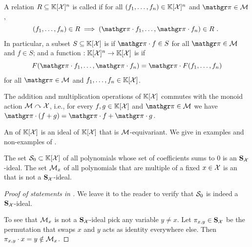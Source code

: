 A relation $R\subseteq \mathbb{K}[\mathcal{X}]^n$ is called  if for all $(f_1,\dots,f_n)\in \mathbb{K}[\mathcal{X}]^n$ and $\gelem\in\monoid$,
\[
(f_1,\dots,f_n)\in R \implies (\gelem\cdot f_1,\dots,\gelem\cdot f_n)\in R \ .
\
\]
In particular, a subset $S \subseteq \mathbb{K}[\mathcal{X}]$ is  if $\gelem \cdot f\in S$ for all $\gelem \in \monoid$ and $f \in S$;
and a function $ : \mathbb{K}[\mathcal{X}]^n \to \mathbb{K}[\mathcal{X}]$ is \kl{$\monoid$-equivariant} if
\[
F(\gelem\cdot f_1,\dots,\gelem\cdot f_n) = \gelem\cdot F(f_1,\dots,f_n)
\]
for all $\gelem \in \monoid$ and $f_1,\dots,f_n \in \mathbb{K}[\mathcal{X}]$.
%
\begin{observation}
The addition and multiplication operations of $\mathbb{K}[\mathcal{X}]$ commutes with the monoid action $\mathcal{M}\curvearrowright\mathcal{X}$,
i.e., for every $f,g\in\mathbb{K}[\mathcal{X}]$ and $\gelem\in\monoid$ we have
$\gelem\cdot(f + g) = \gelem\cdot f + \gelem\cdot g$.
\end{observation}
%
An  of $\mathbb{K}[\mathcal{X}]$ is an ideal of $\mathbb{K}[\mathcal{X}]$ that is $\monoid$-equivariant.
We give in \Cref{ex:idl-equiv} examples and non-examples of \kl{$\monoid$-ideals}.
%
\begin{example}\label{ex:idl-equiv}
The set $\idl[S]_0 \subset \poly{\K}{\Indets}$ of all polynomials whose set of coefficients sums to $0$ is an $\mathbf{S}_{\mathcal{X}}$-ideal.
The set $\idl[M]_x$ of all polynomials that are multiple of a fixed $x \in \mathcal{X}$ is an \kl{ideal} that is not a $\mathbf{S}_{\mathcal{X}}$-ideal.
\end{example}
%
\begin{proof}[Proof of statements in ]
We leave it to the reader to verify that $\idl[S]_0$ is indeed a $\mathbf{S}_{\mathcal{X}}$-ideal.

To see that $\idl[M]_x$ is not a $\mathbf{S}_{\mathcal{X}}$-ideal pick any variable $y\neq x$.
Let $\pi_{x,y}\in\mathbf{S}_{\mathcal{X}}$ be the permutation that swaps $x$ and $y$ acts as identity everywhere else.
Then $\pi_{x,y}\cdot x = y \notin \idl[M]_x$.
\end{proof}

